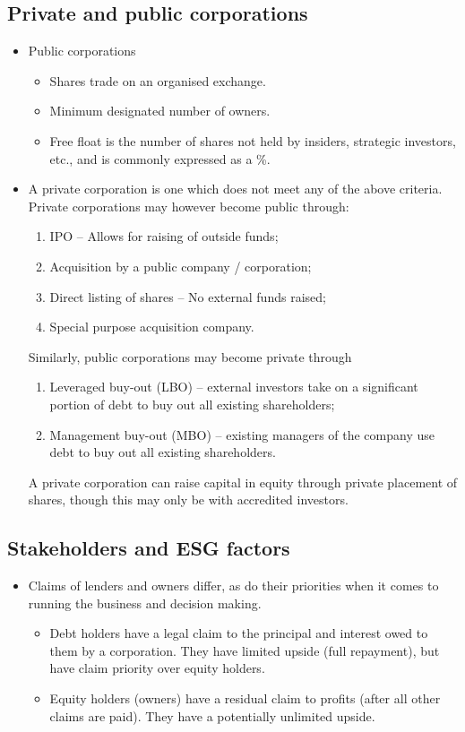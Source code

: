 \documentclass[../notes_compiled.tex]{subfiles}
\begin{document}
\subsection{Private and public corporations}
\begin{itemize}
\item Public corporations
\begin{itemize}
\item Shares trade on an organised exchange.
\item Minimum designated number of owners.
\item Free float is the number of shares not held by insiders, strategic investors, etc., and is commonly expressed as a \%.
\end{itemize}
\item A private corporation is one which does not meet any of the above criteria. Private corporations may however become public through:
\begin{enumerate}
\item IPO -- Allows for raising of outside funds;
\item Acquisition by a public company / corporation;
\item Direct listing of shares -- No external funds raised;
\item Special purpose acquisition company.
\end{enumerate}
Similarly, public corporations may become private through
\begin{enumerate}
\item Leveraged buy-out (LBO) -- external investors take on a significant portion of debt to buy out all existing shareholders;
\item Management buy-out (MBO) -- existing managers of the company use debt to buy out all existing shareholders.
\end{enumerate}
A private corporation can raise capital in equity through private placement of shares, though this may only be with accredited investors.
\end{itemize}

\subsection{Stakeholders and ESG factors}
\begin{itemize}
\item Claims of lenders and owners differ, as do their priorities when it comes to running the business and decision making. 
\begin{itemize}
\item Debt holders have a legal claim to the principal and interest owed to them by a corporation. They have limited upside (full repayment), but have claim priority over equity holders.
\item Equity holders (owners) have a residual claim to profits (after all other claims are paid). They have a potentially unlimited upside.
\end{itemize}
\end{itemize}
\end{document}
